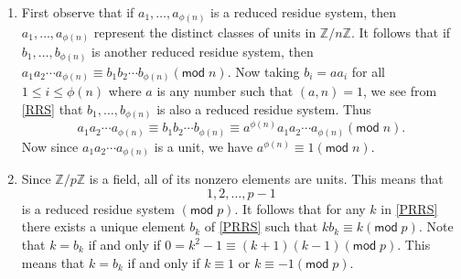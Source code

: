 \documentclass[12pt]{article}
\renewcommand{\pmod}[1]{\left(\mathsf{mod}\;#1\right)}
\begin{document}
\begin{enumerate}
\item %
First observe that if $a_1,\ldots,a_{\phi\left(n\right)}$
is a reduced residue system, then 
$a_1,\ldots,a_{\phi\left(n\right)}$ represent the distinct
classes of units in $\mathbb{Z}/n\mathbb{Z}$.
It follows that if $b_1,\ldots,b_{\phi\left(n\right)}$
is another reduced residue system, then
$a_1a_2\cdots a_{\phi\left(n\right)}
\equiv b_1b_2\cdots b_{\phi\left(n\right)}\pmod{n}$.
Now taking $b_i=aa_i$ for all $1\le i\le\phi\left(n\right)$
where $a$ is any number such that $\left(a,n\right)=1$,
we see from \autoref{RRS} that
$b_1,\ldots,b_{\phi\left(n\right)}$
is also a reduced residue system. Thus
\[a_1a_2\cdots a_{\phi\left(n\right)}
\equiv b_1b_2\cdots b_{\phi\left(n\right)}\equiv
a^{\phi\left(n\right)}a_1a_2\cdots a_{\phi\left(n\right)}
\pmod{n}.\]
Now since
$a_1a_2\cdots a_{\phi\left(n\right)}$ is a unit, we have
$a^{\phi\left(n\right)}\equiv 1\pmod{n}$.

\item %
Since $\mathbb{Z}/p\mathbb{Z}$ is a field, all of its
nonzero elements are units. This means that
\begin{equation}\label{PRRS}
1,2,\ldots,p-1
\end{equation}
is a reduced residue system $\pmod{p}$. It follows
that for any $k$ in \autoref{PRRS} there exists
a unique element $b_k$ of \autoref{PRRS} such that
$kb_k\equiv k\pmod{p}$.
Note that $k=b_k$ if and only if $0=k^2-1\equiv
\left(k+1\right)\left(k-1\right)\pmod{p}$.
This means that $k=b_k$ if and only if $k\equiv 1$
or $k\equiv -1\pmod{p}$.


\end{enumerate}
\end{document}
